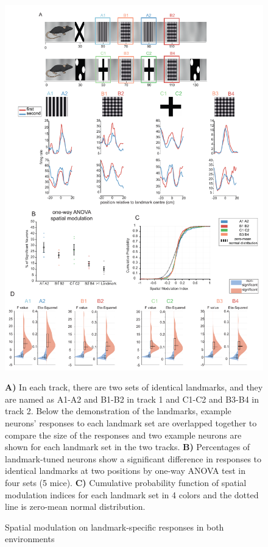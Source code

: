 \begin{figure}
    \centering
    \includegraphics[width=1\linewidth]{figures//Chapter 4 V1/fig3_spatial_modulation_intro.pdf}
    \caption{Spatial modulation on landmark-specific responses in both environments}
\medskip
\small
\textbf{A)} In each track, there are two sets of identical landmarks, and they are named as A1-A2 and B1-B2 in track 1 and C1-C2 and B3-B4 in track 2. Below the demonstration of the landmarks, example neurons' responses to each landmark set are overlapped together to compare the size of the responses and two example neurons are shown for each landmark set in the two tracks. \textbf{B)} Percentages of landmark-tuned neurons show a significant difference in responses to identical landmarks at two positions by one-way ANOVA test in four sets (5 mice). \textbf{C)} Cumulative probability function of spatial modulation indices for each landmark set in 4 colors and the dotted line is zero-mean normal distribution.
    
    \label{fig:placeholder}
\end{figure}

